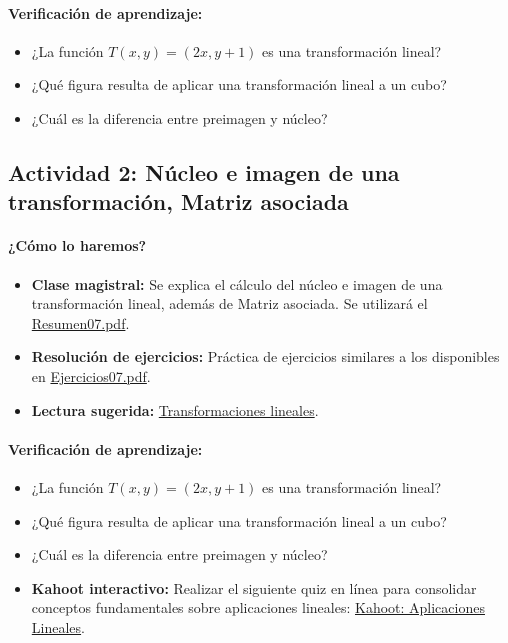\documentclass[a4,11pt]{aleph-notas}
\begin{document}
\paragraph{Verificación de aprendizaje:}  
\begin{itemize}
    \item ¿La función \( T(x, y) = (2x, y+1) \) es una transformación lineal?
    \item ¿Qué figura resulta de aplicar una transformación lineal a un cubo?
    \item ¿Cuál es la diferencia entre preimagen y núcleo?
\end{itemize}

\subsection*{Actividad 2: Núcleo e imagen de una transformación, Matriz asociada}
\paragraph{¿Cómo lo haremos?}
\begin{itemize}[leftmargin=*]
    \item \textbf{Clase magistral:} Se explica el cálculo del núcleo e imagen de una transformación lineal, además de Matriz asociada. Se utilizará el \href{https://fcena-puce.github.io/AlgLinealyGeomAnalitica-05-N0068/2-Resumenes/Resumen07.pdf}{Resumen07.pdf}.
    \item \textbf{Resolución de ejercicios:} Práctica de ejercicios similares a los disponibles en \href{https://fcena-puce.github.io/AlgLinealyGeomAnalitica-05-N0068/2-Ejercicios/Ejercicios07.pdf}{Ejercicios07.pdf}.
    \item \textbf{Lectura sugerida:} \href{https://blog.nekomath.com/lineal-i-transformaciones-lineales/}{Transformaciones lineales}.
\end{itemize}

\paragraph{Verificación de aprendizaje:}  
\begin{itemize}
    \item ¿La función \( T(x, y) = (2x, y+1) \) es una transformación lineal?
    \item ¿Qué figura resulta de aplicar una transformación lineal a un cubo?
    \item ¿Cuál es la diferencia entre preimagen y núcleo?
    \item \textbf{Kahoot interactivo:} Realizar el siguiente quiz en línea para consolidar conceptos fundamentales sobre aplicaciones lineales: \href{https://create.kahoot.it/share/aplicaciones-lineales/54f82b8b-de9b-4622-a288-e809584d4186}{Kahoot: Aplicaciones Lineales}.
\end{itemize}
\end{document}
